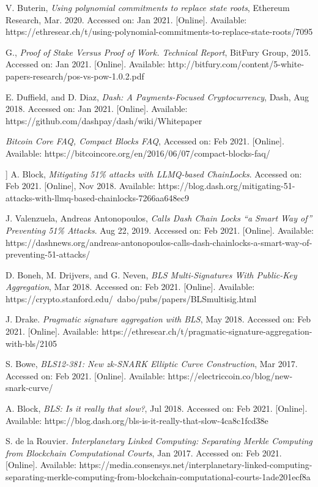 \documentclass[peerreview]{ieeesyscoin}
\begin{document}
\begin{thebibliography}{00}
 V. Buterin, \textit{Using polynomial commitments to replace state roots}, Ethereum Research, Mar. 2020. Accessed on: Jan 2021. [Online]. Available: https://ethresear.ch/t/using-polynomial-commitments-to-replace-state-roots/7095

 G., \textit{Proof of Stake Versus Proof of Work. Technical Report}, BitFury Group, 2015. Accessed on: Jan 2021. [Online]. Available: http://bitfury.com/content/5-white-papers-research/pos-vs-pow-1.0.2.pdf 

 E. Duffield, and D. Diaz, \textit{Dash: A Payments-Focused Cryptocurrency}, Dash, Aug 2018. Accessed on: Jan 2021. [Online]. Available: https://github.com/dashpay/dash/wiki/Whitepaper

 \textit{Bitcoin Core FAQ, Compact Blocks FAQ}, Accessed on: Feb 2021. [Online]. Available: https://bitcoincore.org/en/2016/06/07/compact-blocks-faq/

 ] A. Block, \textit{Mitigating 51\% attacks with LLMQ-based ChainLocks}. Accessed on: Feb 2021. [Online], Nov 2018. Available: https://blog.dash.org/mitigating-51-attacks-with-llmq-based-chainlocks-7266aa648ec9

 J. Valenzuela, Andreas Antonopoulos, \textit{Calls Dash Chain Locks “a Smart Way of” Preventing 51\% Attacks}. Aug 22, 2019. Accessed on: Feb 2021. [Online]. Available: https://dashnews.org/andreas-antonopoulos-calls-dash-chainlocks-a-smart-way-of-preventing-51-attacks/

 D. Boneh, M. Drijvers, and G. Neven, \textit{BLS Multi-Signatures With Public-Key Aggregation}, Mar 2018. Accessed on: Feb 2021. [Online]. Available: https://crypto.stanford.edu/~dabo/pubs/papers/BLSmultisig.html

 J. Drake. \textit{Pragmatic signature aggregation with BLS}, May 2018. Accessed on: Feb 2021. [Online]. Available:  https://ethresear.ch/t/pragmatic-signature-aggregation-with-bls/2105

 S. Bowe, \textit{BLS12-381: New zk-SNARK Elliptic Curve Construction}, Mar 2017. Accessed on: Feb 2021. [Online]. Available: https://electriccoin.co/blog/new-snark-curve/

  A. Block, \textit{BLS: Is it really that slow?}, Jul 2018. Accessed on: Feb 2021. [Online]. Available: https://blog.dash.org/bls-is-it-really-that-slow-4ca8c1fcd38e

  S. de la Rouvier. \textit{Interplanetary Linked Computing: Separating Merkle Computing from Blockchain Computational Courts}, Jan 2017. Accessed on: Feb 2021. [Online]. Available: https://media.consensys.net/interplanetary-linked-computing-separating-merkle-computing-from-blockchain-computational-courts-1ade201ecf8a


\end{thebibliography}
\end{document}

